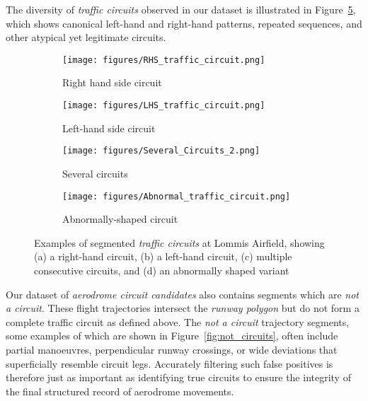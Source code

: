 \documentclass[
  manuscript=proceedings,  %
  layout=preprint,         %
  year=2025,
  volume=x,
]{extra/joas}
\begin{document}
The diversity of \textit{traffic circuits} observed in our dataset is illustrated in Figure~\ref{fig:circuits}, which shows canonical left-hand and right-hand patterns, repeated sequences, and other atypical yet legitimate circuits. 

\newcommand{\imgfactor}{0.88}

\vspace{-1em}
\begin{figure}[ht!]
  \centering
  
  \begin{subfigure}{0.24\textwidth}
    \centering
    \texttt{[image: figures/RHS\_traffic\_circuit.png]}
    \caption{Right hand side circuit}
    \label{fig:circuit_a}
  \end{subfigure}
  \hfill
  \begin{subfigure}{0.24\textwidth}
    \centering
    \texttt{[image: figures/LHS\_traffic\_circuit.png]}
    \caption{Left-hand side circuit}
    \label{fig:circuit_b}
  \end{subfigure}
  \hfill
  \begin{subfigure}{0.25\textwidth}
    \centering
    \texttt{[image: figures/Several\_Circuits\_2.png]}
    \caption{Several circuits}
    \label{fig:circuit_c}
  \end{subfigure}
  \hfill
  \begin{subfigure}{0.25\textwidth}
    \centering
    \texttt{[image: figures/Abnormal\_traffic\_circuit.png]}
    \caption{Abnormally-shaped circuit}
    \label{fig:circuit_d}
  \end{subfigure}

  \caption{Examples of segmented \textit{traffic circuits} at Lommis Airfield, showing (a) a right-hand circuit, (b) a left-hand circuit, (c) multiple consecutive circuits, and (d) an abnormally shaped variant}
  \label{fig:circuits}
\end{figure}

Our dataset of \textit{aerodrome circuit candidates} also contains segments which are \textit{not a circuit}. These flight trajectories intersect the \textit{runway polygon} but do not form a complete traffic circuit as defined above. The \textit{not a circuit} trajectory segments, some examples of which are shown in Figure~\ref{fig:not_circuits}, often include partial manoeuvres, perpendicular runway crossings, or wide deviations that superficially resemble circuit legs. Accurately filtering such false positives is therefore just as important as identifying true circuits to ensure the integrity of the final structured record of aerodrome movements.
\end{document}
